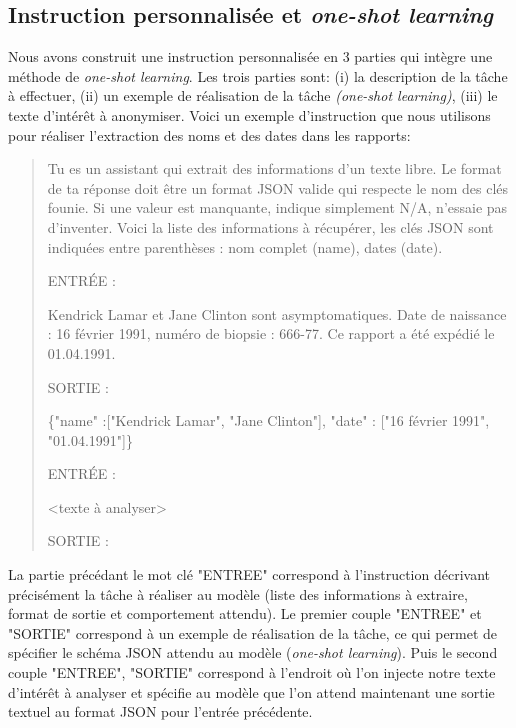 \subsection{Instruction personnalisée et \textit{one-shot learning}}
Nous avons construit une instruction personnalisée en 3 parties qui intègre une méthode de \textit{one-shot learning}. Les trois parties sont: (i) la description de la tâche à effectuer, (ii) un exemple de réalisation de la tâche \textit{(one-shot learning)}, (iii) le texte d'intérêt à anonymiser.
Voici un exemple d'instruction que nous utilisons pour réaliser l'extraction des noms et des dates dans les rapports:
\begin{quote}
Tu es un assistant qui extrait des informations d'un texte libre. Le format de ta réponse doit être un format JSON valide qui respecte le nom des clés founie. Si une valeur est manquante, indique simplement N/A, n'essaie pas d'inventer. Voici la liste des informations à récupérer, les clés JSON sont indiquées entre parenthèses : nom complet (name), dates (date).

ENTRÉE :

Kendrick Lamar et Jane Clinton sont asymptomatiques. Date de naissance : 16 février 1991, numéro de biopsie : 666-77. Ce rapport a été expédié le 01.04.1991.

SORTIE :

\{"name" :["Kendrick Lamar", "Jane Clinton"], "date" : ["16 février 1991", "01.04.1991"]\}

ENTRÉE :

<texte à analyser>

SORTIE :
\end{quote}

La partie précédant le mot clé "ENTREE" correspond à l'instruction décrivant précisément la tâche à réaliser au modèle (liste des informations à extraire, format de sortie et comportement attendu). Le premier couple "ENTREE" et "SORTIE" correspond à un exemple de réalisation de la tâche, ce qui permet de spécifier le schéma JSON attendu au modèle (\textit{one-shot learning}). Puis le second couple "ENTREE", "SORTIE" correspond à l'endroit où l'on injecte notre texte d'intérêt à analyser et spécifie au modèle que l'on attend maintenant une sortie textuel au format JSON pour l'entrée précédente.

